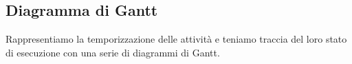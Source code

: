 \subsection{Diagramma di Gantt}

Rappresentiamo la temporizzazione delle attivit\`a e teniamo traccia del loro stato di esecuzione con una serie di diagrammi di Gantt.


